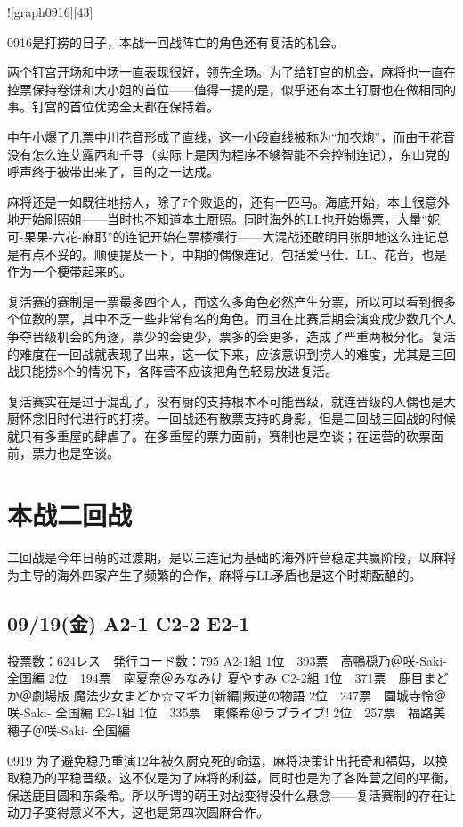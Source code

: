 ![graph0916][43]

0916是打捞的日子，本战一回战阵亡的角色还有复活的机会。

两个钉宫开场和中场一直表现很好，领先全场。为了给钉宫的机会，麻将也一直在控票保持卷饼和大小姐的首位——值得一提的是，似乎还有本土钉厨也在做相同的事。钉宫的首位优势全天都在保持着。

中午小爆了几票中川花音形成了直线，这一小段直线被称为“加农炮”，而由于花音没有怎么连艾露西和千寻（实际上是因为程序不够智能不会控制连记），东山党的呼声终于被带出来了，目的之一达成。

麻将还是一如既往地捞人，除了7个败退的，还有一匹马。海底开始，本土很意外地开始刷照姐——当时也不知道本土厨照。同时海外的LL也开始爆票，大量“妮可-果果-六花-麻耶”的连记开始在票楼横行——大混战还敢明目张胆地这么连记总是有点不妥的。顺便提及一下，中期的偶像连记，包括爱马仕、LL、花音，也是作为一个梗带起来的。

复活赛的赛制是一票最多四个人，而这么多角色必然产生分票，所以可以看到很多个位数的票，其中不乏一些非常有名的角色。而且在比赛后期会演变成少数几个人争夺晋级机会的角逐，票少的会更少，票多的会更多，造成了严重两极分化。复活的难度在一回战就表现了出来，这一仗下来，应该意识到捞人的难度，尤其是三回战只能捞8个的情况下，各阵营不应该把角色轻易放进复活。

复活赛实在是过于混乱了，没有厨的支持根本不可能晋级，就连晋级的人偶也是大厨怀念旧时代进行的打捞。一回战还有散票支持的身影，但是二回战三回战的时候就只有多重屋的肆虐了。在多重屋的票力面前，赛制也是空谈；在运营的砍票面前，票力也是空谈。

\section{本战二回战}

二回战是今年日萌的过渡期，是以三连记为基础的海外阵营稳定共赢阶段，以麻将为主导的海外四家产生了频繁的合作，麻将与LL矛盾也是这个时期酝酿的。

\subsection{09/19(金) A2-1 C2-2 E2-1}

	投票数：624レス　発行コード数：795
	A2-1組
	1位　393票　高鴨穏乃＠咲-Saki- 全国編
	2位　194票　南夏奈＠みなみけ 夏やすみ
	C2-2組
	1位　371票　鹿目まどか＠劇場版 魔法少女まどか☆マギカ[新編]叛逆の物語
	2位　247票　園城寺怜＠咲-Saki- 全国編
	E2-1組
	1位　335票　東條希＠ラブライブ!
	2位　257票　福路美穂子＠咲-Saki- 全国編

0919 为了避免稳乃重演12年被久厨克死的命运，麻将决策让出托奇和福妈，以换取稳乃的平稳晋级。这不仅是为了麻将的利益，同时也是为了各阵营之间的平衡，保送鹿目圆和东条希。所以所谓的萌王对战变得没什么悬念——复活赛制的存在让动刀子变得意义不大，这也是第四次圆麻合作。

